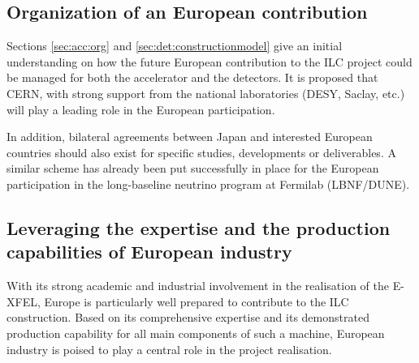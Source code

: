 \documentclass[%
 reprint,
 floatfix,
 amsmath,amssymb,
 aps,
]{revtex4-1}
\begin{document}


\subsection{\label{sec:discussionOrg} Organization of an European contribution}
Sections \ref{sec:acc:org} and \ref{sec:det:constructionmodel} give an initial understanding on how the future European contribution
to the ILC project could be managed for both the accelerator and the detectors. It is proposed that CERN, with strong support from the national laboratories (DESY, Saclay, etc.) will play a leading role in the European participation. 

In addition, bilateral agreements between Japan and interested European countries should also exist for specific studies, developments or deliverables. A similar scheme has already been put successfully in place for the European participation in the long-baseline neutrino program at Fermilab (LBNF/DUNE).
\vspace{0.5cm}
\subsection{\label{sec:discussionInd}Leveraging the expertise and the production capabilities of European industry}
With its strong academic and industrial involvement in the realisation of the E-XFEL, Europe is particularly well prepared to contribute to the ILC construction. Based on its comprehensive expertise and its demonstrated production capability for all main components of such a machine, European industry is poised to play a central role in the project realisation. 
\end{document}
